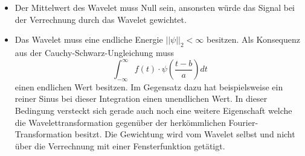 \begin{itemize}
	\item Der Mittelwert des Wavelet muss Null sein, ansonsten würde das Signal bei der Verrechnung durch das Wavelet gewichtet.
	\item Das Wavelet muss eine endliche Energie $||\psi||_2<\infty$ besitzen. Als Konsequenz aus der Cauchy-Schwarz-Ungleichung muss
	\begin{equation}
		\int_{-\infty}^{\infty} f(t)\cdot\psi\left(\frac{t-b}{a}\right) dt
		\label{wavelets:equation5}
	\end{equation}
	einen endlichen Wert besitzen. Im Gegensatz dazu hat beispielsweise ein reiner Sinus bei dieser Integration einen unendlichen Wert. In dieser Bedingung versteckt sich gerade auch noch eine weitere Eigenschaft welche die Wavelettransformation gegenüber der herkömmlichen Fourier-Transformation besitzt. Die Gewichtung wird vom Wavelet selbst und nicht über die Verrechnung mit einer Fensterfunktion getätigt.
\end{itemize}








